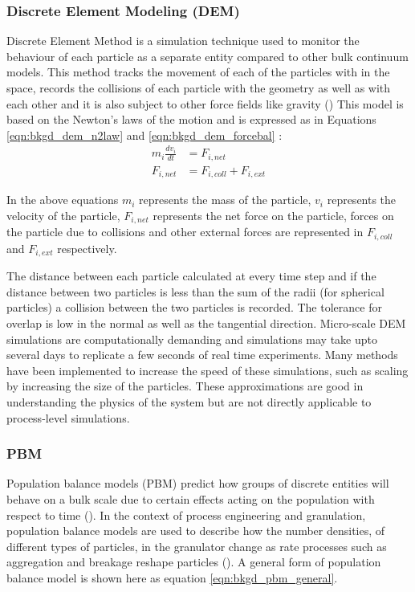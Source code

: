 \documentclass[preprint,11pt,authoryear]{elsarticle}
\begin{document}
\subsubsection{Discrete Element Modeling (DEM)}
\par Discrete Element Method is a simulation technique used to monitor the behaviour of each particle 
as a separate entity compared to other bulk continuum models. This method tracks the movement of 
each of the particles with in the space, records the collisions of each particle with the geometry as well 
as with each other and it is also subject to other force fields like gravity (\cite{Barrasso2015cerd})  This 
model is based on the Newton's laws of the motion and is expressed as in Equations 
\ref{eqn:bkgd_dem_n2law} and  \ref{eqn:bkgd_dem_forcebal} : \\
\begin{align}
m_i\frac{dv_i}{dt} &= F_{i,net} \label{eqn:bkgd_dem_n2law} \\
F_{i,net} &=  F_{i,coll} +  F_{i,ext} \label{eqn:bkgd_dem_forcebal}
\end{align}
\par  In the above equations $m_i$ represents the mass of the particle, $v_i$ represents the velocity of 
the particle, $F_{i,net}$  represents the net force on the particle, forces on the particle due to collisions 
and other external forces are represented in $F_{i,coll}$ and $F_{i,ext}$ respectively.
\par The distance between each particle calculated at every time step and if the distance between two 
particles is less than the sum of the radii (for spherical particles)  a collision between the two particles 
is recorded. The tolerance for overlap is low in the normal as well as the tangential direction. 
Micro-scale DEM simulations are computationally demanding and simulations may take upto several 
days to replicate a few seconds of real time experiments. Many methods have been implemented to 
increase the speed of these simulations, such as scaling by increasing the size of the particles. These 
approximations are good in understanding the physics of the system but are not directly applicable to 
process-level simulations. 
  

\subsubsection{PBM}
	    \par Population balance models (PBM) predict how groups of discrete entities will behave on a 
        bulk scale due to certain effects acting on the population with respect to time 
        (\cite{ramkrishna2014}). In the context of process engineering and granulation, population 
        balance models are used to describe how the number densities, of different types of particles, in 
        the granulator change as rate processes such as aggregation and breakage reshape particles 
        (\cite{Barrasso2013}). A general form of population balance model is shown here as equation 
        \ref{eqn:bkgd_pbm_general}.
	    
\end{document}
